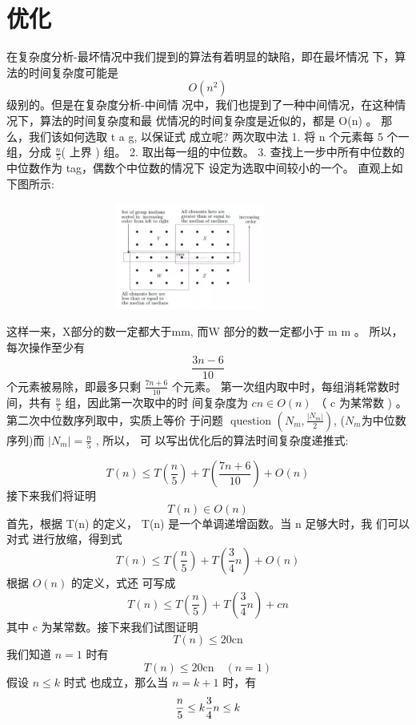 \section{优化}
在复杂度分析-最坏情况中我们提到的算法有着明显的缺陷，即在最坏情况 下，算法的时间复杂度可能是 
$$O\left(n^{2}\right)$$
级别的。但是在复杂度分析-中间情 况中，我们也提到了一种中间情况，在这种情况下，算法的时间复杂度和最 优情况的时间复杂度是近似的，都是  O(n)  。
那么，我们该如何选取  t a g,  以保证式 成立呢?
两次取中法
1. 将 $ \mathrm{n}$  个元素每 5 个一组，分成  $\frac{n}{5}$(  上界  )  组。
2. 取出每一组的中位数。
3. 查找上一步中所有中位数的中位数作为 tag，偶数个中位数的情况下 设定为选取中间较小的一个。
直观上如下图所示:
\begin{figure}[h]
	\begin{minipage}[t]{1\linewidth}
		\centering
		\includegraphics[width=10cm,height=3.5cm]{image/kth2.png}
	\end{minipage}
\end{figure}
这样一来，X部分的数一定都大于mm, 而W  部分的数一定都小于  m m  。 所以，每次操作至少有  $$\frac{3 n-6}{10} $$ 个元素被易除，即最多只剩  $\frac{7 n+6}{10} $ 个元素。
第一次组内取中时，每组消耗常数时间，共有  $ \frac{n}{5} $  组，因此第一次取中的时 间复杂度为  $ c n \in O(n) $ （ c  为某常数  ) 。  第二次中位数序列取中，实质上等价 于问题 
$\text { question }\left(N_{m}, \frac{\left|N_{m}\right|}{2}\right)$,
($N_{m}$为中位数序列)而  $ \left|N_{m}\right|=\frac{n}{5} $ ,  所以， 可 以写出优化后的算法时间复杂度递推式:


$$T(n) \leq T\left(\frac{n}{5}\right)+T\left(\frac{7 n+6}{10}\right)+O(n)$$
接下来我们将证明
$$T(n) \in O(n)$$
首先，根据  T(n)  的定义，  T(n)  是一个单调递增函数。当  n  足够大时，我 们可以对式 进行放缩，得到式
$$T(n) \leq T\left(\frac{n}{5}\right)+T\left(\frac{3}{4} n\right)+O(n)$$
根据 $ O(n) $ 的定义，式还 可写成
$$T(n) \leq T\left(\frac{n}{5}\right)+T\left(\frac{3}{4} n\right)+c n$$
其中  c  为某常数。接下来我们试图证明
$$T(n) \leq 20 \mathrm{cn}$$
我们知道 $ n=1 $ 时有
$$T(n) \leq 20 \mathrm{cn} \quad(n=1)$$
假设 $ n \leq k$  时式 也成立，那么当  $n=k+1$  时，有
$$
\frac{n}{5} \leq k \\
\frac{3}{4} n \leq k
$$

